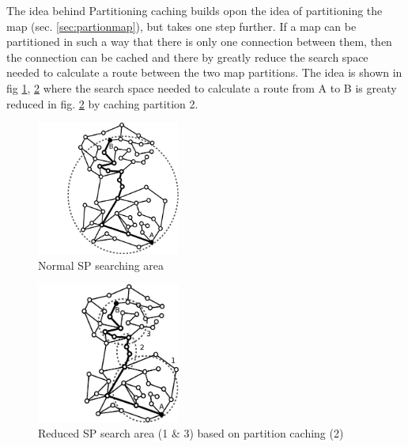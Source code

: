 The idea behind Partitioning caching builds opon the idea of partitioning the map (sec. \ref{sec:partionmap}), but takes one step further. If a map can be partitioned in such a way that there is only one connection between them, then the connection can be cached and there by greatly reduce the search space needed to calculate a route between the two map partitions. The idea is shown in fig \ref{fig:cacheB}, \ref{fig:cacheA} where the search space needed to calculate a route from A to B is greaty reduced in fig. \ref{fig:cacheA} by caching partition 2.

\begin{figure}
  \center
	\includegraphics[width=0.42\textwidth]{figures/partSPcacheB.pdf}
	\caption{Normal SP searching area}
  \label{fig:cacheB}
\end{figure}

\begin{figure}
  \center
	\includegraphics[width=0.42\textwidth]{figures/partSPcacheA.pdf}
	\caption{Reduced SP search area (1 \& 3) based on partition caching (2)}
  \label{fig:cacheA}
\end{figure}


